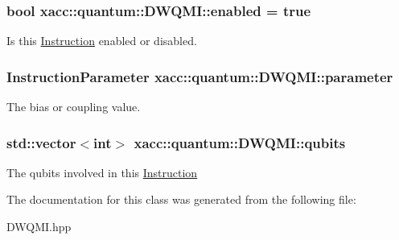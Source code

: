 \subsubsection[{\texorpdfstring{enabled}{enabled}}]{\setlength{\rightskip}{0pt plus 5cm}bool xacc\+::quantum\+::\+D\+W\+Q\+M\+I\+::enabled = true\hspace{0.3cm}{\ttfamily [protected]}}\hypertarget{a00033_ae06f0e1952dea7381cbae3cd3954de1f}{}\label{a00033_ae06f0e1952dea7381cbae3cd3954de1f}
Is this \hyperlink{a00046}{Instruction} enabled or disabled. 
\subsubsection[{\texorpdfstring{parameter}{parameter}}]{\setlength{\rightskip}{0pt plus 5cm}Instruction\+Parameter xacc\+::quantum\+::\+D\+W\+Q\+M\+I\+::parameter\hspace{0.3cm}{\ttfamily [protected]}}\hypertarget{a00033_a30249f83412fb56f7c8be9ec0ad726a9}{}\label{a00033_a30249f83412fb56f7c8be9ec0ad726a9}
The bias or coupling value. 
\subsubsection[{\texorpdfstring{qubits}{qubits}}]{\setlength{\rightskip}{0pt plus 5cm}std\+::vector$<$int$>$ xacc\+::quantum\+::\+D\+W\+Q\+M\+I\+::qubits\hspace{0.3cm}{\ttfamily [protected]}}\hypertarget{a00033_a5fc6e587225f365b150ef58fc7d2ed32}{}\label{a00033_a5fc6e587225f365b150ef58fc7d2ed32}
The qubits involved in this \hyperlink{a00046}{Instruction} 

The documentation for this class was generated from the following file\+:\begin{DoxyCompactItemize}
\item 
D\+W\+Q\+M\+I.\+hpp\end{DoxyCompactItemize}

